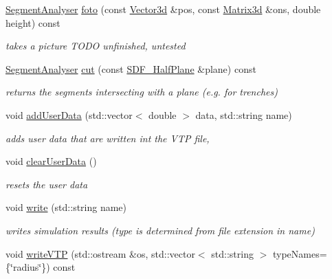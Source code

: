 \begin{DoxyCompactItemize}
\hyperlink{classCPlantBox_1_1SegmentAnalyser}{Segment\+Analyser} \hyperlink{classCPlantBox_1_1SegmentAnalyser_a1fab801299f985363e46a4eb6e37e7dd}{foto} (const \hyperlink{classCPlantBox_1_1Vector3d}{Vector3d} \&pos, const \hyperlink{classCPlantBox_1_1Matrix3d}{Matrix3d} \&ons, double height) const
\begin{DoxyCompactList}\small\item\em takes a picture T\+O\+DO unfinished, untested \end{DoxyCompactList}\item 
\hyperlink{classCPlantBox_1_1SegmentAnalyser}{Segment\+Analyser} \hyperlink{classCPlantBox_1_1SegmentAnalyser_a777f3abc5ed7a351ca228e1bf7da0957}{cut} (const \hyperlink{classCPlantBox_1_1SDF__HalfPlane}{S\+D\+F\+\_\+\+Half\+Plane} \&plane) const
\begin{DoxyCompactList}\small\item\em returns the segments intersecting with a plane (e.\+g. for trenches) \end{DoxyCompactList}\item 
void \hyperlink{classCPlantBox_1_1SegmentAnalyser_acfe719897fa503aa9af4b1d906f9d051}{add\+User\+Data} (std\+::vector$<$ double $>$ data, std\+::string name)
\begin{DoxyCompactList}\small\item\em adds user data that are written int the V\+TP file, \end{DoxyCompactList}\item 
\mbox{\label{classCPlantBox_1_1SegmentAnalyser_a39063b19c632b1809febe4219228123a}} 
void \hyperlink{classCPlantBox_1_1SegmentAnalyser_a39063b19c632b1809febe4219228123a}{clear\+User\+Data} ()
\begin{DoxyCompactList}\small\item\em resets the user data \end{DoxyCompactList}\item 
void \hyperlink{classCPlantBox_1_1SegmentAnalyser_a2d01686f47050ae3362d61d34390fd4b}{write} (std\+::string name)
\begin{DoxyCompactList}\small\item\em writes simulation results (type is determined from file extension in name) \end{DoxyCompactList}\item 
void \hyperlink{classCPlantBox_1_1SegmentAnalyser_a491635f641d9f9ce71bf3efee352ff66}{write\+V\+TP} (std\+::ostream \&os, std\+::vector$<$ std\+::string $>$ type\+Names=\{\char`\"{}radius\char`\"{}\}) const

\end{DoxyCompactItemize}

